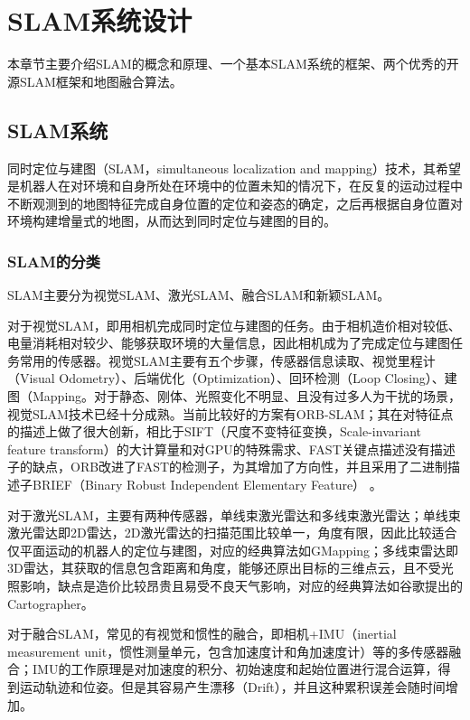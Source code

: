 \renewcommand{\baselinestretch}{1.5}
\fontsize{12pt}{13pt}\selectfont

\chapter{SLAM系统设计} \label{System Overview}
本章节主要介绍SLAM的概念和原理、一个基本SLAM系统的框架、两个优秀的开源SLAM框架和地图融合算法。

\section{SLAM系统}
同时定位与建图（SLAM，simultaneous localization and mapping）技术，其希望是机器人在对环境和自身所处在环境中的位置未知的情况下，在反复的运动过程中不断观测到的地图特征完成自身位置的定位和姿态的确定，之后再根据自身位置对环境构建增量式的地图，从而达到同时定位与建图的目的。


\subsection{SLAM的分类} \label{3.1.1}
SLAM主要分为视觉SLAM、激光SLAM、融合SLAM和新颖SLAM。


对于视觉SLAM，即用相机完成同时定位与建图的任务。由于相机造价相对较低、电量消耗相对较少、能够获取环境的大量信息，因此相机成为了完成定位与建图任务常用的传感器。视觉SLAM主要有五个步骤，传感器信息读取、视觉里程计（Visual Odometry）、后端优化（Optimization）、回环检测（Loop Closing）、建图（Mapping。对于静态、刚体、光照变化不明显、且没有过多人为干扰的场景，视觉SLAM技术已经十分成熟。当前比较好的方案有ORB-SLAM；其在对特征点的描述上做了很大创新，相比于SIFT（尺度不变特征变换，Scale-invariant feature transform）的大计算量和对GPU的特殊需求、FAST关键点描述没有描述子的缺点，ORB改进了FAST的检测子，为其增加了方向性，并且采用了二进制描述子BRIEF（Binary Robust Independent Elementary Feature） \cite{rublee2011orb}。


对于激光SLAM，主要有两种传感器，单线束激光雷达和多线束激光雷达；单线束激光雷达即2D雷达，2D激光雷达的扫描范围比较单一，角度有限，因此比较适合仅平面运动的机器人的定位与建图，对应的经典算法如GMapping；多线束雷达即3D雷达，其获取的信息包含距离和角度，能够还原出目标的三维点云，且不受光照影响，缺点是造价比较昂贵且易受不良天气影响\cite{杨明2000基于激光雷达的移动机器人环境建模与避障}，对应的经典算法如谷歌提出的Cartographer。


对于融合SLAM，常见的有视觉和惯性的融合，即相机+IMU（inertial measurement unit，惯性测量单元，包含加速度计和角加速度计）等的多传感器融合；IMU的工作原理是对加速度的积分、初始速度和起始位置进行混合运算，得到运动轨迹和位姿。但是其容易产生漂移（Drift），并且这种累积误差会随时间增加\cite{avrutov2017calibration}。


